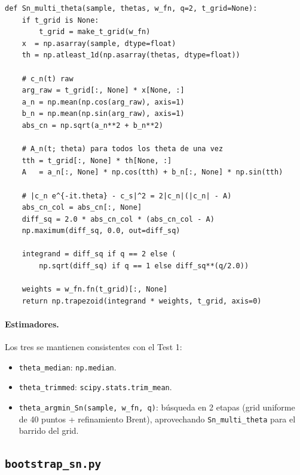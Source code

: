 \documentclass[11pt,a4paper]{article}
\begin{document}
\begin{lstlisting}[style=pystyle, caption={Vectorización de $S_n(\theta)$}]
def Sn_multi_theta(sample, thetas, w_fn, q=2, t_grid=None):
    if t_grid is None:
        t_grid = make_t_grid(w_fn)
    x  = np.asarray(sample, dtype=float)
    th = np.atleast_1d(np.asarray(thetas, dtype=float))

    # c_n(t) raw
    arg_raw = t_grid[:, None] * x[None, :]
    a_n = np.mean(np.cos(arg_raw), axis=1)
    b_n = np.mean(np.sin(arg_raw), axis=1)
    abs_cn = np.sqrt(a_n**2 + b_n**2)

    # A_n(t; theta) para todos los theta de una vez
    tth = t_grid[:, None] * th[None, :]
    A   = a_n[:, None] * np.cos(tth) + b_n[:, None] * np.sin(tth)

    # |c_n e^{-it.theta} - c_s|^2 = 2|c_n|(|c_n| - A)
    abs_cn_col = abs_cn[:, None]
    diff_sq = 2.0 * abs_cn_col * (abs_cn_col - A)
    np.maximum(diff_sq, 0.0, out=diff_sq)

    integrand = diff_sq if q == 2 else (
        np.sqrt(diff_sq) if q == 1 else diff_sq**(q/2.0))

    weights = w_fn.fn(t_grid)[:, None]
    return np.trapezoid(integrand * weights, t_grid, axis=0)
\end{lstlisting}

\paragraph{Estimadores.} Los tres se mantienen consistentes con el Test 1:
\begin{itemize}[leftmargin=*]
    \item \texttt{theta\_median}: \texttt{np.median}.
    \item \texttt{theta\_trimmed}: \texttt{scipy.stats.trim\_mean}.
    \item \texttt{theta\_argmin\_Sn(sample, w\_fn, q)}: búsqueda en 2 etapas
    (grid uniforme de 40 puntos + refinamiento Brent), aprovechando
    \texttt{Sn\_multi\_theta} para el barrido del grid.
\end{itemize}

\subsection{\texttt{bootstrap\_sn.py}}
\end{document}
